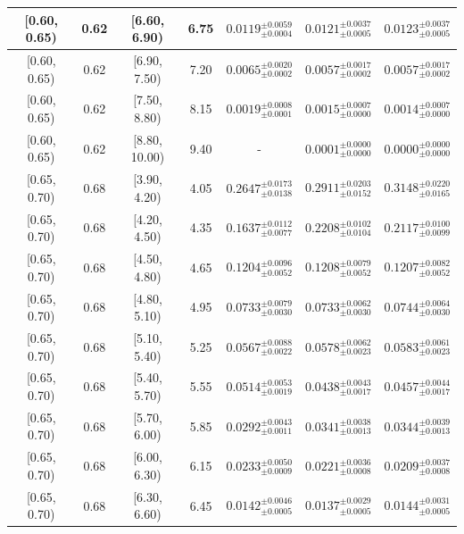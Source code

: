 \begin{longtable}{|c|c|c|c|c|c|c|}
\hline
[0.60, 0.65) & 0.62 & [6.60, 6.90) & 6.75 & $0.0119^{ \pm 0.0059 }_{ \pm 0.0004 }$ & $0.0121^{ \pm 0.0037 }_{ \pm 0.0005 }$ & $0.0123^{ \pm 0.0037 }_{ \pm 0.0005 }$ \\ 
\hline
[0.60, 0.65) & 0.62 & [6.90, 7.50) & 7.20 & $0.0065^{ \pm 0.0020 }_{ \pm 0.0002 }$ & $0.0057^{ \pm 0.0017 }_{ \pm 0.0002 }$ & $0.0057^{ \pm 0.0017 }_{ \pm 0.0002 }$ \\ 
\hline
[0.60, 0.65) & 0.62 & [7.50, 8.80) & 8.15 & $0.0019^{ \pm 0.0008 }_{ \pm 0.0001 }$ & $0.0015^{ \pm 0.0007 }_{ \pm 0.0000 }$ & $0.0014^{ \pm 0.0007 }_{ \pm 0.0000 }$ \\ 
\hline
[0.60, 0.65) & 0.62 & [8.80, 10.00) & 9.40 & - & $0.0001^{ \pm 0.0000 }_{ \pm 0.0000 }$ & $0.0000^{ \pm 0.0000 }_{ \pm 0.0000 }$ \\ 
\hline
[0.65, 0.70) & 0.68 & [3.90, 4.20) & 4.05 & $0.2647^{ \pm 0.0173 }_{ \pm 0.0138 }$ & $0.2911^{ \pm 0.0203 }_{ \pm 0.0152 }$ & $0.3148^{ \pm 0.0220 }_{ \pm 0.0165 }$ \\ 
\hline
[0.65, 0.70) & 0.68 & [4.20, 4.50) & 4.35 & $0.1637^{ \pm 0.0112 }_{ \pm 0.0077 }$ & $0.2208^{ \pm 0.0102 }_{ \pm 0.0104 }$ & $0.2117^{ \pm 0.0100 }_{ \pm 0.0099 }$ \\ 
\hline
[0.65, 0.70) & 0.68 & [4.50, 4.80) & 4.65 & $0.1204^{ \pm 0.0096 }_{ \pm 0.0052 }$ & $0.1208^{ \pm 0.0079 }_{ \pm 0.0052 }$ & $0.1207^{ \pm 0.0082 }_{ \pm 0.0052 }$ \\ 
\hline
[0.65, 0.70) & 0.68 & [4.80, 5.10) & 4.95 & $0.0733^{ \pm 0.0079 }_{ \pm 0.0030 }$ & $0.0733^{ \pm 0.0062 }_{ \pm 0.0030 }$ & $0.0744^{ \pm 0.0064 }_{ \pm 0.0030 }$ \\ 
\hline
[0.65, 0.70) & 0.68 & [5.10, 5.40) & 5.25 & $0.0567^{ \pm 0.0088 }_{ \pm 0.0022 }$ & $0.0578^{ \pm 0.0062 }_{ \pm 0.0023 }$ & $0.0583^{ \pm 0.0061 }_{ \pm 0.0023 }$ \\ 
\hline
[0.65, 0.70) & 0.68 & [5.40, 5.70) & 5.55 & $0.0514^{ \pm 0.0053 }_{ \pm 0.0019 }$ & $0.0438^{ \pm 0.0043 }_{ \pm 0.0017 }$ & $0.0457^{ \pm 0.0044 }_{ \pm 0.0017 }$ \\ 
\hline
[0.65, 0.70) & 0.68 & [5.70, 6.00) & 5.85 & $0.0292^{ \pm 0.0043 }_{ \pm 0.0011 }$ & $0.0341^{ \pm 0.0038 }_{ \pm 0.0013 }$ & $0.0344^{ \pm 0.0039 }_{ \pm 0.0013 }$ \\ 
\hline
[0.65, 0.70) & 0.68 & [6.00, 6.30) & 6.15 & $0.0233^{ \pm 0.0050 }_{ \pm 0.0009 }$ & $0.0221^{ \pm 0.0036 }_{ \pm 0.0008 }$ & $0.0209^{ \pm 0.0037 }_{ \pm 0.0008 }$ \\ 
\hline
[0.65, 0.70) & 0.68 & [6.30, 6.60) & 6.45 & $0.0142^{ \pm 0.0046 }_{ \pm 0.0005 }$ & $0.0137^{ \pm 0.0029 }_{ \pm 0.0005 }$ & $0.0144^{ \pm 0.0031 }_{ \pm 0.0005 }$ \\ 

\end{longtable}

